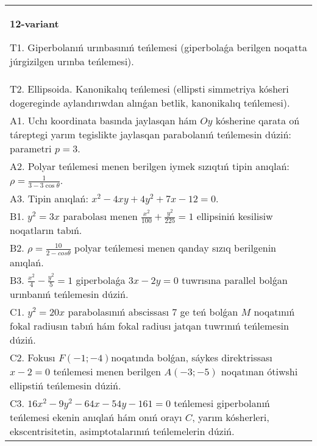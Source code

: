 \documentclass{article}
\begin{document}
\begin{tabular}{m{17cm}}
\textbf{12-variant}
\newline

T1. Giperbolanıń urınbasınıń teńlemesi (giperbolaǵa berilgen noqatta júrgizilgen urınba teńlemesi).\\

T2. Ellipsoida. Kanonikalıq teńlemesi (ellipsti simmetriya kósheri dogereginde aylandırıwdan alınǵan betlik, kanonikalıq teńlemesi).\\

A1. Uchı koordinata basında jaylasqan hám $Oy$ kósherine qarata oń táreptegi yarım tegislikte jaylasqan parabolanıń teńlemesin dúziń: parametri $p=3$.\\

A2. Polyar teńlemesi menen berilgen iymek sızıqtıń tipin anıqlań: $\rho=\frac{1}{3-3\cos\theta}$.\\

A3. Tipin anıqlań: $x^{2}-4 xy+4 y^{2}+7 x-12=0$.\\

B1. $y^{2} = 3x$ parabolası menen $\frac{x^{2}}{100} + \frac{y^{2}}{225} = 1$ ellipsiniń kesilisiw noqatların tabıń.  \\

B2. $\rho = \frac{10}{2 - cos\theta}$ polyar teńlemesi menen qanday sızıq berilgenin anıqlań.  \\

B3. $\frac{x^{2}}{4} - \frac{y^{2}}{5} = 1$ giperbolaǵa $3x - 2y = 0$ tuwrısına parallel bolǵan urınbanıń teńlemesin dúziń.  \\

C1. $y^{2} = 20x$ parabolasınıń abscissası 7 ge teń bolǵan $M$ noqatınıń fokal radiusın tabıń hám fokal radiusı jatqan tuwrınıń teńlemesin dúziń.  \\

C2. Fokusı $F( - 1; - 4)$noqatında bolǵan, sáykes direktrissası $x - 2 = 0$ teńlemesi menen berilgen $A( - 3; - 5)$ noqatınan ótiwshi ellipstiń teńlemesin dúziń.  \\

C3. $16x^{2} - 9y^{2} - 64x - 54y - 161 = 0$ teńlemesi giperbolanıń teńlemesi ekenin anıqlań hám onıń orayı $C$, yarım kósherleri, ekscentrisitetin, asimptotalarınıń teńlemelerin dúziń.  \\

\end{tabular}
\vspace{1cm}
\end{document}
